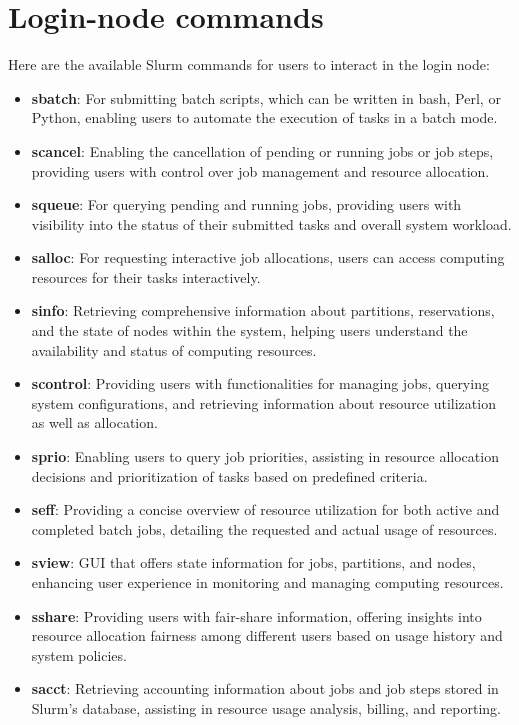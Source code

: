 \section{Login-node commands}

Here are the available Slurm commands for users to interact in the login node:

\begin{itemize}
    \item \textbf{sbatch}: For submitting batch scripts, which can be written in bash, Perl, or Python, enabling users to automate the execution of tasks in a batch mode.
    \item \textbf{scancel}: Enabling the cancellation of pending or running jobs or job steps, providing users with control over job management and resource allocation.
    \item \textbf{squeue}: For querying pending and running jobs, providing users with visibility into the status of their submitted tasks and overall system workload.
    \item \textbf{salloc}: For requesting interactive job allocations, users can access computing resources for their tasks interactively.
    \item \textbf{sinfo}: Retrieving comprehensive information about partitions, reservations, and the state of nodes within the system, helping users understand the availability and status of computing resources.
    \item \textbf{scontrol}: Providing users with functionalities for managing jobs, querying system configurations, and retrieving information about resource utilization as well as allocation.
    \item \textbf{sprio}: Enabling users to query job priorities, assisting in resource allocation decisions and prioritization of tasks based on predefined criteria.
    \item \textbf{seff}: Providing a concise overview of resource utilization for both active and completed batch jobs, detailing the requested and actual usage of resources.
    \item \textbf{sview}: GUI that offers state information for jobs, partitions, and nodes, enhancing user experience in monitoring and managing computing resources.
    \item \textbf{sshare}: Providing users with fair-share information, offering insights into resource allocation fairness among different users based on usage history and system policies.
    \item \textbf{sacct}: Retrieving accounting information about jobs and job steps stored in Slurm's database, assisting in resource usage analysis, billing, and reporting.

\end{itemize}
